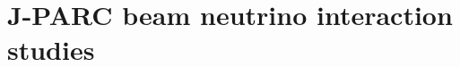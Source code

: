 

\pagebreak
\newpage
\chapter{J-PARC beam neutrino interaction studies}
\label{c:neutrinoT2K}







 
